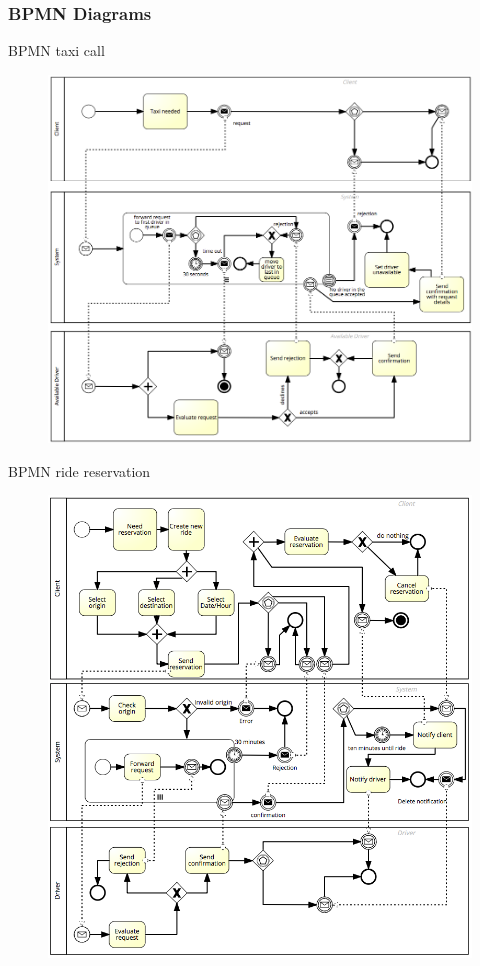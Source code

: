 \documentclass[9pt]{beamer}
\begin{document}
\subsubsection{BPMN Diagrams}
\begin{frame}{BPMN taxi call}
\begin{figure}[H]
\includegraphics[height=0.8\textheight]{BPMN-rideRequest}
\centering
\label{fig:bpmndiagramrequest}
\end{figure}
\end{frame}

\begin{frame}{BPMN ride reservation}
\begin{figure}[H]
\includegraphics[height=0.8\textheight]{BPMN-rideReservation}
\centering
\label{fig:bpmndiagramreservation}
\end{figure}
\end{frame}
\end{document}
